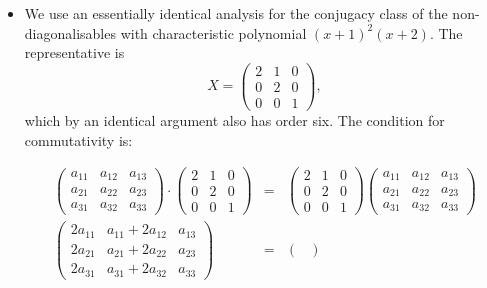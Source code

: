 \documentclass[11pt]{article} \usepackage{amssymb}
\begin{document}
\begin{enumerate}
\begin{enumerate}
\begin{itemize}
      \item
        We use an essentially identical analysis for the conjugacy class
        of the non-diagonalisables with characteristic polynomial $(x+1)^2(x+2)$.
        The representative is
        \begin{equation*}
          X=
          \begin{pmatrix}
            2&1  &0 \\ 
            0&2  &0 \\ 
            0&0  &1 
          \end{pmatrix},
        \end{equation*}
        which by an identical argument also has order six. The condition for
        commutativity is:
        
        
        \begin{eqnarray*}
          \begin{pmatrix}
            a_{11}&a_{12}  &a_{13} \\ 
            a_{21}&a_{22}  &a_{23} \\ 
            a_{31}&a_{32}  &a_{33} 
          \end{pmatrix}
          \cdot
          \begin{pmatrix}
            2&1  &0 \\ 
            0&2  &0 \\ 
            0&0  &1
          \end{pmatrix}
          &=&
          \begin{pmatrix}
            2&1  &0 \\ 
            0&2  &0 \\ 
            0&0  &1
          \end{pmatrix}
          \begin{pmatrix}
            a_{11}&a_{12}  &a_{13} \\ 
            a_{21}&a_{22}  &a_{23} \\ 
            a_{31}&a_{32}  &a_{33} 
          \end{pmatrix}
          \\
          \begin{pmatrix}
            2a_{11}&a_{11}+2a_{12}  &a_{13} \\ 
            2a_{21}&a_{21}+2a_{22}  &a_{23} \\ 
            2a_{31}&a_{31}+2a_{32}  &a_{33} 
          \end{pmatrix}
          &=&
          \begin{pmatrix}

\end{pmatrix}
\end{eqnarray*}
\end{itemize}
\end{enumerate}
\end{enumerate}
\end{document}
